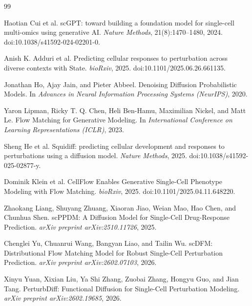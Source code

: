 \documentclass[11pt]{article}
\begin{document}
\begin{thebibliography}{99}

  Haotian Cui et al.
  \newblock scGPT: toward building a foundation model for single-cell multi-omics using generative AI.
  \newblock \emph{Nature Methods}, 21(8):1470--1480, 2024.
  \newblock doi:10.1038/s41592-024-02201-0.

  Anish K. Adduri et al.
  \newblock Predicting cellular responses to perturbation across diverse contexts with State.
  \newblock \emph{bioRxiv}, 2025.
  \newblock doi:10.1101/2025.06.26.661135.

  Jonathan Ho, Ajay Jain, and Pieter Abbeel.
  \newblock Denoising Diffusion Probabilistic Models.
  \newblock In \emph{Advances in Neural Information Processing Systems (NeurIPS)}, 2020.

  Yaron Lipman, Ricky T. Q. Chen, Heli Ben-Hamu, Maximilian Nickel, and Matt Le.
  \newblock Flow Matching for Generative Modeling.
  \newblock In \emph{International Conference on Learning Representations (ICLR)}, 2023.

  Sheng He et al.
  \newblock Squidiff: predicting cellular development and responses to perturbations using a diffusion model.
  \newblock \emph{Nature Methods}, 2025.
  \newblock doi:10.1038/s41592-025-02877-y.

  Dominik Klein et al.
  \newblock CellFlow Enables Generative Single-Cell Phenotype Modeling with Flow Matching.
  \newblock \emph{bioRxiv}, 2025.
  \newblock doi:10.1101/2025.04.11.648220.

  Zhaokang Liang, Shuyang Zhuang, Xiaoran Jiao, Weian Mao, Hao Chen, and Chunhua Shen.
  \newblock scPPDM: A Diffusion Model for Single-Cell Drug-Response Prediction.
  \newblock \emph{arXiv preprint arXiv:2510.11726}, 2025.

  Chenglei Yu, Chuanrui Wang, Bangyan Liao, and Tailin Wu.
  \newblock scDFM: Distributional Flow Matching Model for Robust Single-Cell Perturbation Prediction.
  \newblock \emph{arXiv preprint arXiv:2602.07103}, 2026.

  Xinyu Yuan, Xixian Liu, Ya Shi Zhang, Zuobai Zhang, Hongyu Guo, and Jian Tang.
  \newblock PerturbDiff: Functional Diffusion for Single-Cell Perturbation Modeling.
  \newblock \emph{arXiv preprint arXiv:2602.19685}, 2026.


\end{thebibliography}
\end{document}
